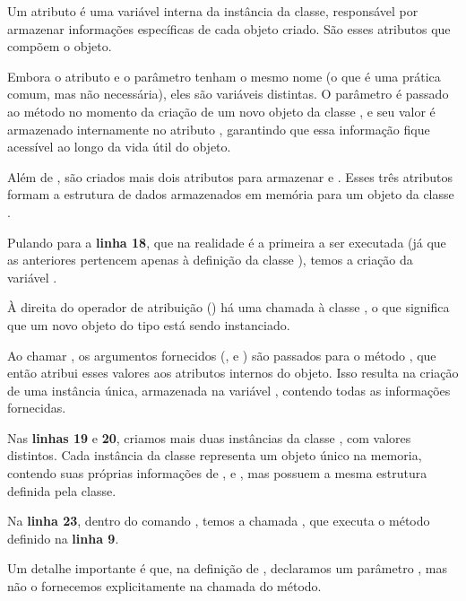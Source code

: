 Um atributo é uma variável interna da instância da classe, responsável por armazenar informações específicas de cada
objeto criado.
São esses atributos que compõem o objeto.

Embora o atributo e o parâmetro tenham o mesmo nome (o que é uma prática comum, mas não necessária), eles são variáveis
distintas.
O parâmetro  é passado ao método  no momento da criação de um novo objeto da classe
, e seu valor é armazenado internamente no atributo , garantindo que essa
informação fique acessível ao longo da vida útil do objeto.

Além de , são criados mais dois atributos para armazenar  e .
Esses três atributos formam a estrutura de dados armazenados em memória para um objeto da classe .


Pulando para a \textbf{linha 18}, que na realidade é a primeira a ser executada (já que as anteriores pertencem apenas
à definição da classe ), temos a criação da variável .

À direita do operador de atribuição (\inlcode{=}) há uma chamada à classe , o que significa que um
novo objeto do tipo  está sendo instanciado.

Ao chamar , os argumentos
fornecidos (,  e ) são passados para o método , que
então atribui esses valores aos atributos internos do objeto.
Isso resulta na criação de uma instância única, armazenada na variável , contendo todas as
informações fornecidas.

Nas \textbf{linhas 19} e \textbf{20}, criamos mais duas instâncias da classe , com valores distintos.
Cada instância da classe representa um objeto único na memoria, contendo suas próprias informações
de ,  e , mas possuem a mesma estrutura definida pela classe.

Na \textbf{linha 23}, dentro do comando , temos a chamada  , que executa o
método  definido na \textbf{linha 9}.

Um detalhe importante é que, na definição de \inlcode{)},
declaramos um parâmetro
, mas não o fornecemos explicitamente na chamada do método.

